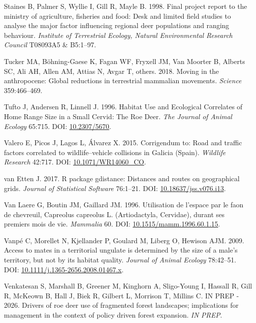 \documentclass[10pt,a4paper]{article}
\newlength{\cslhangindent}
\newenvironment{CSLReferences}[2] %
 {\begin{list}{}{%
  \setlength{\itemindent}{0pt}
  \setlength{\leftmargin}{0pt}
  \setlength{\parsep}{0pt}
  \ifodd #1
   \setlength{\leftmargin}{\cslhangindent}
   \setlength{\itemindent}{-1\cslhangindent}
  \fi
  \setlength{\itemsep}{#2\baselineskip}}}
 {\end{list}}
\begin{document}
\begin{CSLReferences}{1}{0}
Staines B, Palmer S, Wyllie I, Gill R, Mayle B. 1998. Final project report to the ministry of agriculture, fisheries and food: Desk and limited field studies to analyse the major factor influencing regional deer populations and ranging behaviour. \emph{Institute of Terrestrial Ecology, Natural Environmental Research Council} T08093A5 \& B5:1--97.

{Tucker MA, Böhning-Gaese K, Fagan WF, Fryxell JM, Van Moorter B, Alberts SC, Ali AH, Allen AM, Attias N, Avgar T, others}. 2018. Moving in the anthropocene: Global reductions in terrestrial mammalian movements. \emph{Science} 359:466--469.

Tufto J, Andersen R, Linnell J. 1996. Habitat {Use} and {Ecological} {Correlates} of {Home} {Range} {Size} in a {Small} {Cervid}: {The} {Roe} {Deer}. \emph{The Journal of Animal Ecology} 65:715. DOI: \href{https://doi.org/10.2307/5670}{10.2307/5670}.

Valero E, Picos J, Lagos L, Álvarez X. 2015. Corrigendum to: {Road} and traffic factors correlated to wildlife--vehicle collisions in {Galicia} ({Spain}). \emph{Wildlife Research} 42:717. DOI: \href{https://doi.org/10.1071/WR14060_CO}{10.1071/WR14060\_CO}.

{van Etten J}. 2017. R package gdistance: Distances and routes on geographical grids. \emph{Journal of Statistical Software} 76:1--21. DOI: \href{https://doi.org/10.18637/jss.v076.i13}{10.18637/jss.v076.i13}.

Van Laere G, Boutin JM, Gaillard JM. 1996. Utilisation de l'espace par le faon de chevreuil, {Capreolus} capreolus {L}. ({Artiodactyla}, {Cervidae}), durant ses premiers mois de vie. \emph{Mammalia} 60. DOI: \href{https://doi.org/10.1515/mamm.1996.60.1.15}{10.1515/mamm.1996.60.1.15}.

Vanpé C, Morellet N, Kjellander P, Goulard M, Liberg O, Hewison AJM. 2009. Access to mates in a territorial ungulate is determined by the size of a male's territory, but not by its habitat quality. \emph{Journal of Animal Ecology} 78:42--51. DOI: \href{https://doi.org/10.1111/j.1365-2656.2008.01467.x}{10.1111/j.1365-2656.2008.01467.x}.

Venkatesan S, Marshall B, Greener M, Kinghorn A, Sligo-Young I, Hassall R, Gill R, McKeown B, Hall J, Biek R, Gilbert L, Morrison T, Millins C. IN PREP - 2026. Drivers of roe deer use of fragmented forest landscapes; implications for management in the context of policy driven forest expansion. \emph{IN PREP}.


\end{CSLReferences}
\end{document}
